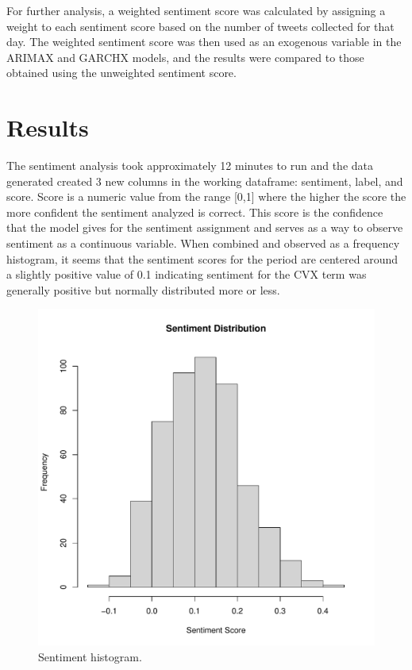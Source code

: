 \documentclass[12pt, letterpaper, titlepage]{article}
\begin{document}
For further analysis, a weighted sentiment score was calculated by assigning a weight to each sentiment score based on the number of tweets collected for that day. The weighted sentiment score was then used as an exogenous variable in the ARIMAX and GARCHX models, and the results were compared to those obtained using the unweighted sentiment score.

\label{sec: results}
\section{Results}

The sentiment analysis took approximately 12 minutes to run and the data generated created 3 new columns in the working dataframe: sentiment, label, and score. Score is a numeric value from the range [0,1] where the higher the score the more confident the sentiment analyzed is correct. This score is the confidence that the model gives for the sentiment assignment and serves as a way to observe sentiment as a continuous variable. When combined and observed as a frequency histogram, it seems that the sentiment scores for the period are centered around a slightly positive value of 0.1 indicating sentiment for the CVX term was generally positive but normally distributed more or less.


\begin{figure}[tbp]
  \begin{center}
  \includegraphics[width=\textwidth]{../figures/fig3.pdf}
  \caption{Sentiment histogram.}\label{fig:sentimenthist}
  \end{center}
\end{figure}
\end{document}
